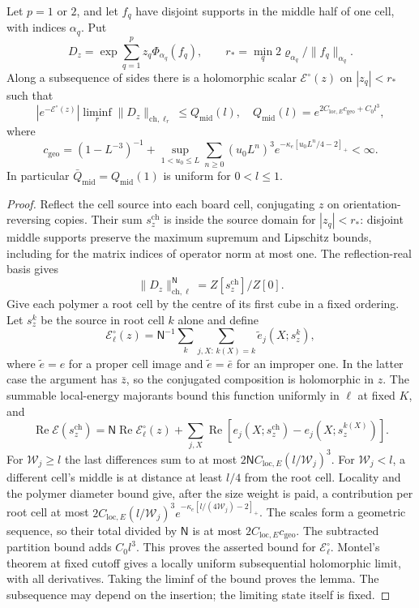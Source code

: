\documentclass[11pt,letterpaper,reqno]{amsart}
\makeatletter
\theoremstyle{definition}
\newcommand{\ms@minorstart}{%
  \pushQED{\qed}\renewcommand{\qedsymbol}{$\blacksquare$}}
\newenvironment{lemma}[1][]{\ms@minorstart\ms@lemma[#1]}
  {\popQED\endms@lemma}
\theoremstyle{remark}
\makeatother
\begin{document}
\begin{lemma}[A cell normalizer]\label{C-389-17}
Let $p=1$ or $2$, and let $f_q$ have disjoint
supports in the middle half of one cell,
with indices $\alpha_q$.  Put
\[
 D_z=\exp\sum_{q=1}^pz_q\Phi_{\alpha_q}(f_q),
 \qquad r_*=\min_q2\varrho_{\alpha_q}/\|f_q\|_{\alpha_q}.
\]
Along a subsequence of sides there is a
holomorphic scalar $\mathcal E^\circ(z)$ on
$|z_q|<r_*$ such that
\[
 |e^{-\mathcal E^\circ(z)}|
 \liminf_r\|D_z\|_{\mathrm{ch},\ell_r}\le Q_{\mathrm{mid}}(l),
 \quad Q_{\mathrm{mid}}(l)=
       e^{2C_{\mathrm{loc},E}c_{\mathrm{geo}}+C_0l^3},
\]
where
\[
 c_{\mathrm{geo}}=(1-L^{-3})^{-1}+
 \sup_{1<u_0\le L}\sum_{n\ge0}(u_0L^n)^3
       e^{-\kappa_e[u_0L^n/4-2]_+}<\infty.
\]
In particular $\bar Q_{\mathrm{mid}}=Q_{\mathrm{mid}}(1)$
is uniform for $0<l\le1$.
\end{lemma}

\begin{proof}
Reflect the cell source into each board cell,
conjugating $z$ on orientation-reversing
copies.  Their sum $s_z^{\mathrm{ch}}$ is
inside the source domain for $|z_q|<r_*$:
disjoint middle supports preserve the maximum
supremum and Lipschitz bounds, including for
the matrix indices of operator norm at most
one.  The reflection-real basis gives
\[
 \|D_z\|_{\mathrm{ch},\ell}^{\mathsf N}
                         =Z[s_z^{\mathrm{ch}}]/Z[0].
\]
Give each polymer a root cell by the centre
of its first cube in a fixed ordering.
Let $s_z^k$ be the source in root cell $k$
alone and define
\[
 \mathcal E_\ell^\circ(z)=\mathsf N^{-1}
 \sum_k\sum_{j,X:\,k(X)=k}\widetilde e_j(X;s_z^k),
\]
where $\widetilde e=e$ for a proper cell
image and $\widetilde e=\bar e$ for an
improper one.  In the latter case the
argument has $\bar z$, so the conjugated
composition is holomorphic in $z$.
The summable local-energy majorants bound
this function uniformly in $\ell$ at fixed
$K$, and
\[
 \operatorname{Re}\mathcal E(s_z^{\mathrm{ch}})
 =\mathsf N\operatorname{Re}\mathcal E_\ell^\circ(z)
 +\sum_{j,X}\operatorname{Re}
       [e_j(X;s_z^{\mathrm{ch}})-e_j(X;s_z^{k(X)})].
\]
For $\mathscr W_j\ge l$ the last differences
sum to at most
$2\mathsf NC_{\mathrm{loc},E}(l/\mathscr W_j)^3$.
For $\mathscr W_j<l$, a different cell's
middle is at distance at least $l/4$ from
the root cell.  Locality and the polymer
diameter bound give, after the size weight
is paid, a contribution per root cell at
most
$2C_{\mathrm{loc},E}(l/\mathscr W_j)^3
e^{-\kappa_e[l/(4\mathscr W_j)-2]_+}$.
The scales form a geometric sequence, so
their total divided by $\mathsf N$ is
at most $2C_{\mathrm{loc},E}c_{\mathrm{geo}}$.
The subtracted partition bound adds $C_0l^3$.
This proves the asserted bound for
$\mathcal E_\ell^\circ$.
Montel's theorem at fixed cutoff gives a
locally uniform subsequential holomorphic
limit, with all derivatives.  Taking the
liminf of the bound proves the lemma.
The subsequence may depend on the insertion;
the limiting state itself is fixed.
\end{proof}
\end{document}
